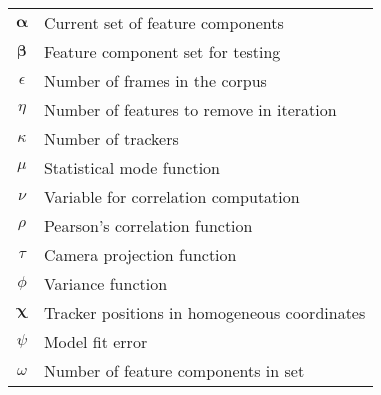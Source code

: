 \documentclass[11pt]{book}  %
\def\currentFeatureSet{\boldsymbol\alpha} %
\def\tempFeatureSet{\boldsymbol\beta} %
\def\framesInCorpus{\epsilon}%
\def\numToRemoveInMask{\eta} %
\def\numTrackers{\kappa} %
\def\modeFunc{\mu} %
\def\correlTemp{\nu}%
\def\correlFunc{\rho} %
\def\projFunc{\tau} %
\def\varFunc{\phi}%
\def\rawTrackingHomog{\boldsymbol\chi}%
\def\modelFitError{\psi}%
\def\numFeaturesInMask{\omega} %
\begin{document}
\begin{center}
\begin{tabular*}{0.75\textwidth}{  c | l  }
$\currentFeatureSet$	& Current set of feature components \\
$\tempFeatureSet$	& Feature component set for testing \\
$\framesInCorpus$	& Number of frames in the corpus \\
$\numToRemoveInMask$	& Number of features to remove in iteration\\
$\numTrackers$		& Number of trackers\\
$\modeFunc$		& Statistical mode function\\
$\correlTemp$		& Variable for correlation computation\\
$\correlFunc$		& Pearson's correlation function\\
$\projFunc$		& Camera projection function \\
$\varFunc$		& Variance function \\
$\rawTrackingHomog$	& Tracker positions in homogeneous coordinates\\
$\modelFitError$	& Model fit error\\
$\numFeaturesInMask$	& Number of feature components in set\\

\end{tabular*}
\end{center}

\newpage
\end{document}
